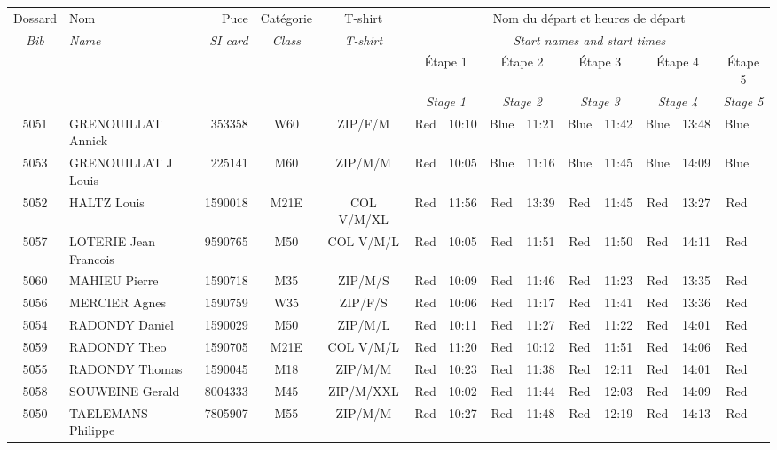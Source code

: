 \documentclass{report}
\begin{document}
  \begin{longtable}{|c|l|r|c|c|*{5}{cc|}}
    Dossard & Nom  & Puce    & Catégorie & T-shirt & \multicolumn{10}{c|}{Nom du départ et heures de départ} \\
    \itshape Bib     & \itshape Name & \itshape SI card & \itshape Class  & \itshape  T-shirt  & \multicolumn{10}{c|}{\itshape Start names and start times} \\
    \hline
    & & & & & \multicolumn{2}{c|}{Étape 1} & \multicolumn{2}{c|}{Étape 2} & \multicolumn{2}{c|}{Étape 3} & \multicolumn{2}{c|}{Étape 4} & \multicolumn{2}{c|}{Étape 5} \\
    & & & & & \multicolumn{2}{c|}{\itshape Stage 1} & \multicolumn{2}{c|}{\itshape Stage 2} & \multicolumn{2}{c|}{\itshape Stage 3} & \multicolumn{2}{c|}{\itshape Stage 4} & \multicolumn{2}{c|}{\itshape Stage 5} \\
    \hline
    5051 & GRENOUILLAT Annick & 353358 & W60 & ZIP/F/M & Red & 10:10 & Blue & 11:21 & Blue & 11:42 & Blue & 13:48 & Blue &  \\
    5053 & GRENOUILLAT J Louis & 225141 & M60 & ZIP/M/M & Red & 10:05 & Blue & 11:16 & Blue & 11:45 & Blue & 14:09 & Blue &  \\
    5052 & HALTZ Louis & 1590018 & M21E & COL V/M/XL & Red & 11:56 & Red & 13:39 & Red & 11:45 & Red & 13:27 & Red &  \\
    5057 & LOTERIE Jean Francois & 9590765 & M50 & COL V/M/L & Red & 10:05 & Red & 11:51 & Red & 11:50 & Red & 14:11 & Red &  \\
    5060 & MAHIEU Pierre & 1590718 & M35 & ZIP/M/S & Red & 10:09 & Red & 11:46 & Red & 11:23 & Red & 13:35 & Red &  \\
    5056 & MERCIER Agnes & 1590759 & W35 & ZIP/F/S & Red & 10:06 & Red & 11:17 & Red & 11:41 & Red & 13:36 & Red &  \\
    5054 & RADONDY Daniel & 1590029 & M50 & ZIP/M/L & Red & 10:11 & Red & 11:27 & Red & 11:22 & Red & 14:01 & Red &  \\
    5059 & RADONDY Theo & 1590705 & M21E & COL V/M/L & Red & 11:20 & Red & 10:12 & Red & 11:51 & Red & 14:06 & Red &  \\
    5055 & RADONDY Thomas & 1590045 & M18 & ZIP/M/M & Red & 10:23 & Red & 11:38 & Red & 12:11 & Red & 14:01 & Red &  \\
    5058 & SOUWEINE Gerald & 8004333 & M45 & ZIP/M/XXL & Red & 10:02 & Red & 11:44 & Red & 12:03 & Red & 14:09 & Red &  \\
    5050 & TAELEMANS Philippe & 7805907 & M55 & ZIP/M/M & Red & 10:27 & Red & 11:48 & Red & 12:19 & Red & 14:13 & Red &  \\
  \end{longtable}
\end{document}
